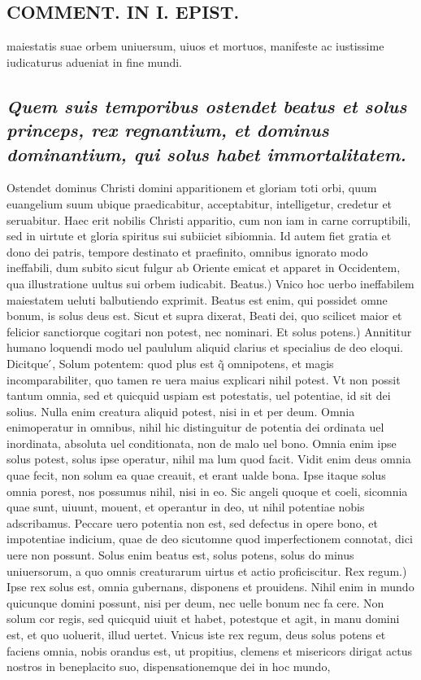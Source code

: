 \documentclass{article}
\begin{document}
\begin{pages}
\section*{COMMENT. IN I. EPIST. }
\marginpar{[ p.538 ]}\pstart maiestatis suae orbem uniuersum, uiuos et mortuos, manifeste ac iustissime iudicaturus adueniat in fine mundi.  \pend
{}
{}
\subsection*{\textit{Quem suis temporibus ostendet beatus et solus princeps, rex regnantium, et dominus dominantium, qui solus habet immortalitatem. }}\pstart Ostendet dominus Christi domini apparitionem et gloriam toti orbi, quum euangelium suum ubique praedicabitur, acceptabitur, intelligetur, credetur et seruabitur. Haec erit nobilis Christi apparitio, cum non iam in carne corruptibili, sed in uirtute et gloria spiritus sui subiiciet sibiomnia. Id autem fiet gratia et dono dei patris, tempore destinato et praefinito, omnibus ignorato modo ineffabili, dum subito sicut fulgur ab Oriente emicat et apparet in Occidentem, qua illustratione uultus sui orbem iudicabit. Beatus.) Vnico hoc uerbo ineffabilem maiestatem ueluti balbutiendo exprimit. Beatus est enim, qui possidet omne bonum, is solus deus est. Sicut et supra dixerat, Beati dei, quo scilicet maior et felicior sanctiorque cogitari non potest, nec nominari. Et solus potens.) Annititur humano loquendi modo uel paululum aliquid clarius et specialius de deo eloqui. Dicitque ́, Solum potentem: quod plus est q̃ omnipotens, et magis incomparabiliter, quo tamen re uera maius explicari nihil potest. Vt non possit tantum omnia, sed et quicquid uspiam est potestatis, uel potentiae, id sit dei solius. Nulla enim creatura aliquid potest, nisi in et per deum. Omnia enimoperatur in omnibus, nihil hic distinguitur de potentia dei ordinata uel inordinata, absoluta uel conditionata, non de malo uel bono. Omnia enim ipse solus potest, solus ipse operatur, nihil ma lum quod facit. Vidit enim deus omnia quae fecit, non solum ea quae creauit, et erant ualde bona. Ipse itaque solus omnia porest, nos possumus nihil, nisi in eo. Sic angeli quoque et coeli, sicomnia quae sunt, uiuunt, mouent, et operantur in deo, ut nihil potentiae nobis adscribamus. Peccare uero potentia non est, sed defectus in opere bono, et impotentiae indicium, quae de deo sicutomne quod imperfectionem connotat, dici uere non possunt. Solus enim beatus est, solus potens, solus do minus uniuersorum, a quo omnis creaturarum uirtus et actio proficiscitur.  \pend\pstart Rex regum.) Ipse rex solus est, omnia gubernans, disponens et prouidens. Nihil enim in mundo quicunque domini possunt, nisi per deum, nec uelle bonum nec fa cere. Non solum cor regis, sed quicquid uiuit et habet, potestque et agit, in manu domini est, et quo uoluerit, illud uertet. Vnicus iste rex regum, deus solus potens et faciens omnia, nobis orandus est, ut propitius, clemens et misericors dirigat actus nostros in beneplacito suo, dispensationemque dei in hoc mundo, 
\end{pages}
\end{document}
